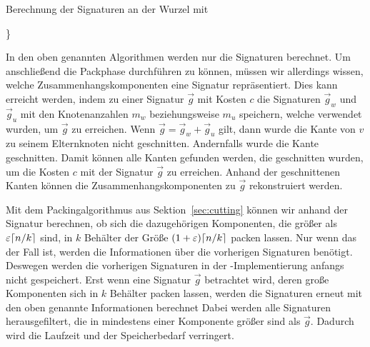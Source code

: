 \begin{algorithm}
    \caption{Berechnung der Signaturen an der Wurzel mit \carfun{}}\label{alg:carfun}
    \begin{algorithmic}[1]
                    \}
                \EndFor
           \EndFor
        \EndFunction
    \end{algorithmic}
\end{algorithm}

\begin{rem}\label{rem:components}
    In den oben genannten Algorithmen werden nur die Signaturen berechnet.
    Um anschließend die Packphase durchführen zu können, müssen wir allerdings wissen, welche Zusammenhangskomponenten eine Signatur repräsentiert.
    Dies kann erreicht werden, indem zu einer Signatur $\vec{g}$ mit Kosten $c$ die Signaturen $\vec{g}_w$ und $\vec{g}_u$ mit den Knotenanzahlen $m_w$ beziehungsweise $m_u$ speichern, welche verwendet wurden, um $\vec{g}$ zu erreichen.
    Wenn $\vec{g} = \vec{g}_w + \vec{g}_u$ gilt, dann wurde die Kante von $v$ zu seinem Elternknoten nicht geschnitten.
    Andernfalls wurde die Kante geschnitten.
    Damit können alle Kanten gefunden werden, die geschnitten wurden, um die Kosten $c$ mit der Signatur $\vec{g}$ zu erreichen.
    Anhand der geschnittenen Kanten können die Zusammenhangskomponenten zu $\vec{g}$ rekonstruiert werden.

    Mit dem Packingalgorithmus aus Sektion~\ref{sec:cutting} können wir anhand der Signatur berechnen, ob sich die dazugehörigen Komponenten, die größer als $\varepsilon \lceil n/k\rceil$ sind, in $k$ Behälter der Größe $(1+\varepsilon) \lceil n/k\rceil$ packen lassen.
    Nur wenn das der Fall ist, werden die Informationen über die vorherigen Signaturen benötigt.
    Deswegen werden die vorherigen Signaturen in der \Cpp{}\hyp Implementierung anfangs nicht gespeichert.
    Erst wenn eine Signatur $\vec{g}$ betrachtet wird, deren große Komponenten sich in $k$ Behälter packen lassen, werden die Signaturen erneut mit den oben genannte Informationen berechnet
    Dabei werden alle Signaturen herausgefiltert, die in mindestens einer Komponente größer sind als $\vec{g}$.
    Dadurch wird die Laufzeit und der Speicherbedarf verringert.
\end{rem}

